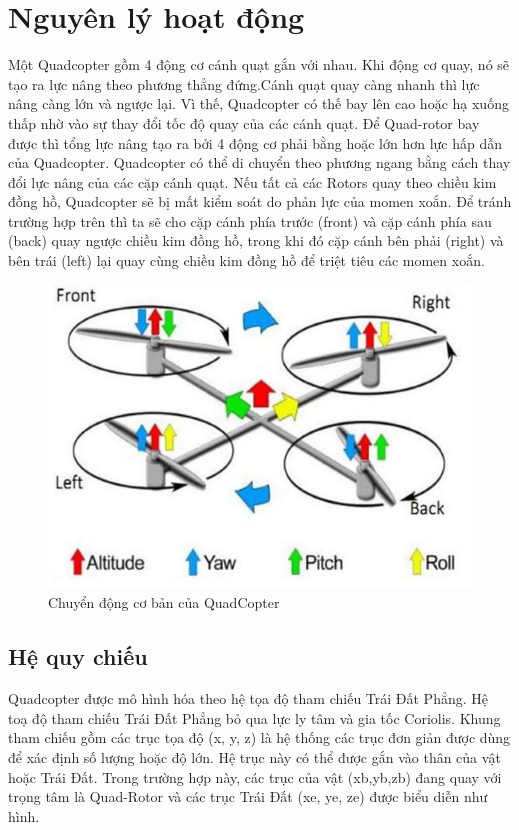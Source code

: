     \section{Nguyên lý hoạt động}
    Một Quadcopter gồm 4 động cơ cánh quạt gắn với nhau. Khi động cơ quay, nó sẽ tạo ra lực nâng theo phương thẳng đứng.Cánh quạt quay càng nhanh thì lực nâng càng lớn và ngược lại. Vì thế, Quadcopter có thế bay lên cao hoặc hạ xuống thấp nhờ vào sự thay đổi tốc độ quay của các cánh quạt. Để Quad-rotor bay được thì tổng lực nâng tạo ra bởi 4 động cơ phải bằng hoặc lớn hơn lực hấp dẫn của Quadcopter.  
    Quadcopter có thể di chuyển theo phương ngang bằng cách thay đổi lực nâng của các cặp cánh quạt. Nếu tất cả các Rotors quay theo chiều kim đồng hồ, Quadcopter sẽ bị mất kiểm soát do phản lực của momen xoắn. Để tránh trường hợp trên thì ta sẽ cho cặp cánh phía trước (front) và cặp cánh phía sau (back) quay ngược chiều kim đồng hồ, trong khi đó cặp cánh bên phải (right) và bên trái (left) lại quay cùng chiều kim đồng hồ để triệt tiêu các momen xoắn.
    \begin{figure}[h!]
	        	\begin{center}
	        		\includegraphics[scale=0.8]{images/Cuong-MoveSim.png}
	        		\caption{Chuyển động cơ bản của QuadCopter}
	        	\end{center}
        \end{figure}
        \subsection{Hệ quy chiếu}
Quadcopter được mô hình hóa theo hệ tọa độ tham chiếu Trái Đất Phẳng. Hệ toạ độ tham chiếu Trái Đất Phẳng bỏ qua lực ly tâm và gia tốc Coriolis.
Khung tham chiếu gồm các trục tọa độ (x, y, z) là hệ thống các trục đơn giản được dùng để xác định số lượng hoặc độ lớn. Hệ trục này có thể được gắn vào thân của vật hoặc Trái Đất. Trong trường hợp này, các trục của vật (xb,yb,zb) đang quay với trọng tâm là Quad-Rotor và các trục Trái Đất (xe, ye, ze) được biểu diễn như hình.                     
